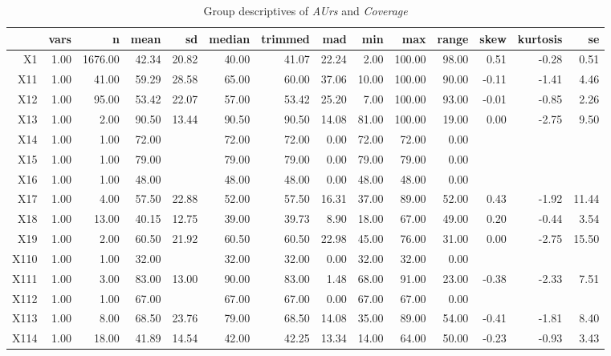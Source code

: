 \begin{table}[ht]
	\small
	\centering
    \begin{tabular}{rrrrrrrrrrrrrr}
        \hline
       & vars & n & mean & sd & median & trimmed & mad & min & max & range & skew & kurtosis & se \\ 
        \hline
      X1 & 1.00 & 1676.00 & 42.34 & 20.82 & 40.00 & 41.07 & 22.24 & 2.00 & 100.00 & 98.00 & 0.51 & -0.28 & 0.51 \\ 
        X11 & 1.00 & 41.00 & 59.29 & 28.58 & 65.00 & 60.00 & 37.06 & 10.00 & 100.00 & 90.00 & -0.11 & -1.41 & 4.46 \\ 
        X12 & 1.00 & 95.00 & 53.42 & 22.07 & 57.00 & 53.42 & 25.20 & 7.00 & 100.00 & 93.00 & -0.01 & -0.85 & 2.26 \\ 
        X13 & 1.00 & 2.00 & 90.50 & 13.44 & 90.50 & 90.50 & 14.08 & 81.00 & 100.00 & 19.00 & 0.00 & -2.75 & 9.50 \\ 
        X14 & 1.00 & 1.00 & 72.00 &  & 72.00 & 72.00 & 0.00 & 72.00 & 72.00 & 0.00 &  &  &  \\ 
        X15 & 1.00 & 1.00 & 79.00 &  & 79.00 & 79.00 & 0.00 & 79.00 & 79.00 & 0.00 &  &  &  \\ 
        X16 & 1.00 & 1.00 & 48.00 &  & 48.00 & 48.00 & 0.00 & 48.00 & 48.00 & 0.00 &  &  &  \\ 
        X17 & 1.00 & 4.00 & 57.50 & 22.88 & 52.00 & 57.50 & 16.31 & 37.00 & 89.00 & 52.00 & 0.43 & -1.92 & 11.44 \\ 
        X18 & 1.00 & 13.00 & 40.15 & 12.75 & 39.00 & 39.73 & 8.90 & 18.00 & 67.00 & 49.00 & 0.20 & -0.44 & 3.54 \\ 
        X19 & 1.00 & 2.00 & 60.50 & 21.92 & 60.50 & 60.50 & 22.98 & 45.00 & 76.00 & 31.00 & 0.00 & -2.75 & 15.50 \\ 
        X110 & 1.00 & 1.00 & 32.00 &  & 32.00 & 32.00 & 0.00 & 32.00 & 32.00 & 0.00 &  &  &  \\ 
        X111 & 1.00 & 3.00 & 83.00 & 13.00 & 90.00 & 83.00 & 1.48 & 68.00 & 91.00 & 23.00 & -0.38 & -2.33 & 7.51 \\ 
        X112 & 1.00 & 1.00 & 67.00 &  & 67.00 & 67.00 & 0.00 & 67.00 & 67.00 & 0.00 &  &  &  \\ 
        X113 & 1.00 & 8.00 & 68.50 & 23.76 & 79.00 & 68.50 & 14.08 & 35.00 & 89.00 & 54.00 & -0.41 & -1.81 & 8.40 \\ 
        X114 & 1.00 & 18.00 & 41.89 & 14.54 & 42.00 & 42.25 & 13.34 & 14.00 & 64.00 & 50.00 & -0.23 & -0.93 & 3.43 \\ 
         \hline
      \end{tabular}
	\caption{Group descriptives of \textit{AUrs} and \textit{Coverage}}
	\label{tbl:descriptives_baysis_matched_AUrs_Cov}
\end{table}

